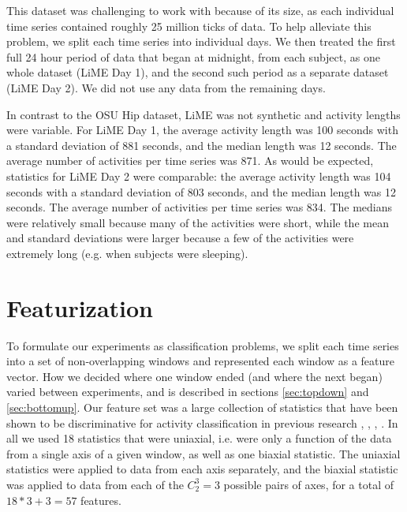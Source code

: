 
This dataset was challenging to work with because of its size, as each individual time series
contained roughly 25 million ticks of data. To help alleviate this problem, we split each
time series into individual days. We then treated the first full 24 hour period of data that began at midnight,
from each subject, as one whole dataset (LiME Day 1), and the second such period as a separate dataset
(LiME Day 2). We did not use any data from the remaining days.

In contrast to the OSU Hip dataset, LiME
was not synthetic and activity lengths were variable. For LiME Day 1, the
average activity length was 100 seconds with a standard deviation of 881 seconds, and the
median length was 12 seconds. The average number of activities per time series was
871. As would be expected, statistics for LiME Day 2 were comparable: the
average activity length was 104 seconds with a standard deviation of 803 seconds, and the
median length was 12 seconds. The average number of activities per time series was 834.
The medians were relatively small because many of the activities were short,
while the mean and standard deviations were larger because a few of the
activities were extremely long (e.g. when subjects were sleeping).

\section{Featurization}
To formulate our experiments as classification problems, we split each time series into a set of
non-overlapping windows and represented each window as a feature vector.
How we decided where one window ended (and where the next began) varied between
experiments, and is described in sections \ref{sec:topdown} and \ref{sec:bottomup}. Our feature
set was a large collection of statistics that have been shown to be discriminative
for activity classification in previous research \cite{li09}, \cite{rothney07},
\cite{staudenmeyer09}, \cite{zheng12}. In all we used 18 statistics that were
uniaxial, i.e. were only a function of the data from a single axis of a given window,
as well as one biaxial statistic.
The uniaxial statistics were applied to data from each axis separately, and
the biaxial statistic was applied to data from each of the $C_2^3=3$ possible pairs of
axes, for a total of $18*3+3 = 57$ features.


